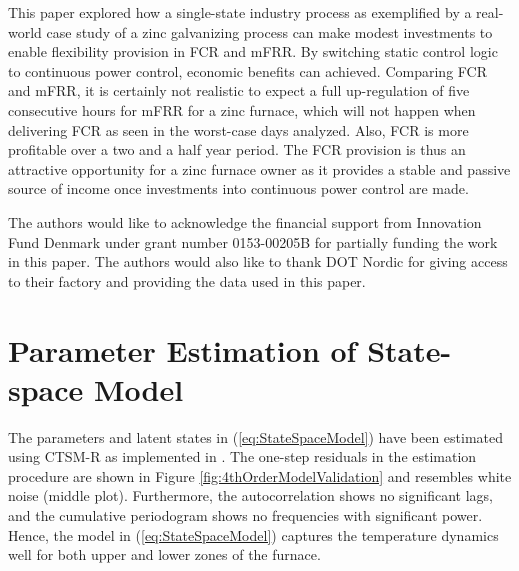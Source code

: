 \documentclass[sigconf]{acmart}
\begin{document}
This paper explored how a single-state industry process as exemplified by a real-world case study of a zinc galvanizing process can make modest investments to enable flexibility provision in FCR and mFRR. By switching static control logic to continuous power control, economic benefits can achieved. Comparing FCR and mFRR, it is certainly not realistic to expect a full up-regulation of five consecutive hours for mFRR for a zinc furnace, which will not happen when delivering FCR as seen in the worst-case days analyzed. Also, FCR is more profitable over a two and a half year period. The FCR provision is thus an attractive opportunity for a zinc furnace owner as it provides a stable and passive source of income once investments into continuous power control are made.

% 

\begin{acks}
    The authors would like to acknowledge the financial support from Innovation Fund Denmark under grant number 0153-00205B for partially funding the work in this paper. The authors would also like to thank DOT Nordic for giving access to their factory and providing the data used in this paper.
\end{acks}






\appendix

\section{Parameter Estimation of State-space Model}\label{app:parameter-estimation}

The parameters and latent states in (\ref{eq:StateSpaceModel}) have been estimated using CTSM-R \cite{juhl2016ctsmr} as implemented in \cite{code}. The one-step residuals in the estimation procedure are shown in Figure \ref{fig:4thOrderModelValidation} and resembles white noise (middle plot). Furthermore, the autocorrelation shows no significant lags, and the cumulative periodogram shows no frequencies with significant power. Hence, the model in (\ref{eq:StateSpaceModel}) captures the temperature dynamics well for both  upper and lower zones of the furnace.
\end{document}
